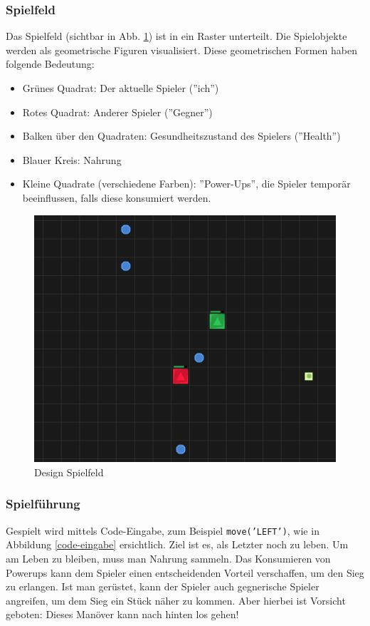 \documentclass[11pt,a4paper,titlepage]{article}
\begin{document}
\subsubsection{Spielfeld}

Das Spielfeld (sichtbar in Abb. \ref{spielfeld}) ist in ein Raster unterteilt. Die Spielobjekte werden als geometrische Figuren visualisiert. Diese geometrischen Formen haben folgende Bedeutung:
\begin{itemize}
\item Grünes Quadrat: Der aktuelle Spieler (''ich'')
\item Rotes Quadrat: Anderer Spieler (''Gegner'')
\item Balken über den Quadraten: Gesundheitszustand des Spielers (''Health'')
\item Blauer Kreis: Nahrung
\item Kleine Quadrate (verschiedene Farben): ''Power-Ups'', die Spieler temporär beeinflussen, falls diese konsumiert werden.
\end{itemize}

\begin{figure}[H]
	\centering
	\includegraphics{game1.png}
	\caption{Design Spielfeld}
	\label{spielfeld}
\end{figure}

\subsubsection{Spielführung}

Gespielt wird mittels Code-Eingabe, zum Beispiel \texttt{move('LEFT')}, wie in Abbildung \ref{code-eingabe} ersichtlich. Ziel ist es, als Letzter noch zu leben. Um am Leben zu bleiben, muss man Nahrung sammeln. Das Konsumieren von Powerups kann dem Spieler einen entscheidenden Vorteil verschaffen, um den Sieg zu erlangen. Ist man gerüstet, kann der Spieler auch gegnerische Spieler angreifen, um dem Sieg ein Stück näher zu kommen. Aber hierbei ist Vorsicht geboten: Dieses Manöver kann nach hinten los gehen!
\end{document}
